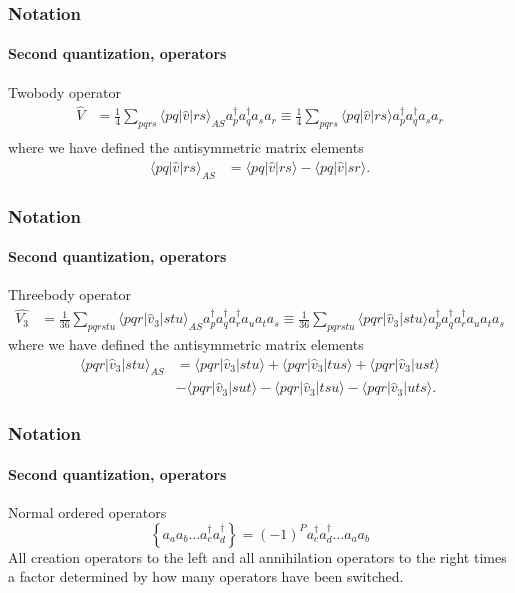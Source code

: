 \documentclass[compress]{beamer}
\newcommand*{\ket}[1]{|#1\rangle}
\newcommand*{\bra}[1]{\langle#1|}
\newcommand{\element}[3]
        {\bra{#1}#2\ket{#3}}
\begin{document}
\begin{frame}[fragile]
    \frametitle{Notation}
    \framesubtitle{Second quantization, operators}
        \small
    \begin{block}{Twobody operator}
        \begin{align*}
            \hat{V} &= \frac{1}{4} \sum_{pqrs} \element{pq}{\hat{v}}{rs}_{AS} a_p^\dagger a_q^\dagger a_s a_r
            \equiv \frac{1}{4} \sum_{pqrs} \element{pq}{\hat{v}}{rs} a_p^\dagger a_q^\dagger a_s a_r \\
        \end{align*}
        where we have defined the antisymmetric matrix elements
        \begin{align*}
            \element{pq}{\hat{v}}{rs}_{AS} &= \element{pq}{\hat{v}}{rs} - \element{pq}{\hat{v}}{sr}.
        \end{align*}
    \end{block}
            
\end{frame}
\begin{frame}[fragile]
    \frametitle{Notation}
    \framesubtitle{Second quantization, operators}
        \small
    \begin{block}{Threebody operator}
        \footnotesize
        \begin{align*}
            \hat{V_3} &= \frac{1}{36} \sum_{pqrstu} \element{pqr}{\hat{v}_3}{stu}_{AS} 
                a_p^\dagger a_q^\dagger a_r^\dagger a_u a_t a_s
            \equiv \frac{1}{36} \sum_{pqrstu} \element{pqr}{\hat{v}_3}{stu}
                a_p^\dagger a_q^\dagger a_r^\dagger a_u a_t a_s
        \end{align*}
        \normalsize
        where we have defined the antisymmetric matrix elements
        \begin{align*}
            \element{pqr}{\hat{v}_3}{stu}_{AS} &= \element{pqr}{\hat{v}_3}{stu} + \element{pqr}{\hat{v}_3}{tus} + \element{pqr}{\hat{v}_3}{ust} \\
            & - \element{pqr}{\hat{v}_3}{sut} - \element{pqr}{\hat{v}_3}{tsu} - \element{pqr}{\hat{v}_3}{uts}.
        \end{align*}
    \end{block}
        
            
\end{frame}
        
\begin{frame}[fragile]
    \frametitle{Notation}
    \framesubtitle{Second quantization, operators}
    \normalsize
    \begin{block}{Normal ordered operators}
        \begin{equation*}
            \left\{a_a a_b \ldots a_c^\dagger a_d^\dagger\right\} = 
                (-1)^P a_c^\dagger a_d^\dagger \ldots a_a a_b
        \end{equation*}
    All creation operators to the left and all annihilation operators to the right times a factor determined by how many operators have been switched.
    \end{block}
        
            
\end{frame}
\end{document}

